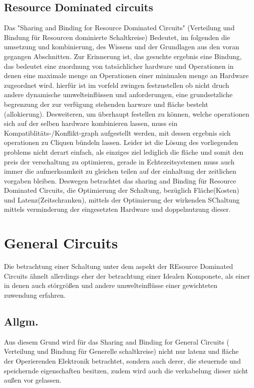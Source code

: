 \documentclass[conference]{IEEEtran}
\begin{document}
\subsection{Resource Dominated circuits}
Das "Sharing and Binding for Resource Dominated Circuits" (Verteilung und Bindung für Resourcen dominierte Schaltkreise) Bedeutet, im folgenden die umsetzung und kombinierung, des Wissens und der Grundlagen aus den voran gegangen Abschnitten.
Zur Erinnerung ist, das gesuchte ergebnis eine Bindung, das bedeutet eine zuordnung von tatsächlicher hardware und Operationen in denen eine maximale menge an Operationen einer minimalen menge an Hardware zugeordnet wird. hierfür ist im vorfeld zwingen festzustellen ob nicht druch andere dynamische umwelteinflüssen und anforderungen, eine grundsetzliche begrenzung der zur verfügung stehenden harware und fläche besteht (allokierung). Desweiteren, um überhaupt festellen zu können, welche operationen sich auf der selben hardware kombinieren lassen, muss ein Kompatiblitäts-/Konflikt-graph aufgestellt werden, mit dessen ergebnis sich operationen zu Cliquen bündeln lassen.
Leider ist die Lösung des vorliegenden problems nicht derart einfach, als einziges ziel lediglich die fläche und somit den preis der verschaltung zu optimieren, gerade in Echtezeitsystemen muss auch immer die aufmerksamkeit zu gleichen teilen auf der einhaltung der zeitlichen vorgaben bleiben.
Deswegen betrachtet das sharing and Binding für Resource Dominated Circuits, die Optimierung der Schaltung, bezüglich Fläche(Kosten) und  Latenz(Zeitschranken), mittels der Optimierung der wirkenden SChaltung mittels verminderung der eingesetzten Hardware und doppelnutzung dieser.\cite[S. 156]{3} 









\section{General Circuits}
Die betrachtung einer Schaltung unter dem aspekt der REsource Dominated Circuits ähnelt allerdings eher der betrachtung einer Idealen Komponete, als einer in denen auch störgrößen und andere umwelteinflüsse einer gewichteten zuwendung erfahren.
\subsection{Allgm.}
Aus diesem Grund wird für das Sharing and Binding for General Circuits ( Verteilung und Bindung für Generelle schaltkreise) nicht nur latenz und fläche der Operierenden Elektronik betrachtet, sondern auch derer, die steuernde und speichernde eigenschaften besitzen, zudem wird auch die verkabelung dieser nicht außen vor gelassen.\cite[S. 156]{3}
\end{document}
